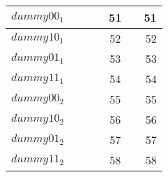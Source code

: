 \begin{tabular}{|l@{\tstrut}|r|r|r|c|r|r|}
$dummy00_1$       &    &  &  &    51 &  & 51   \\ \hline
$dummy10_1$       &    &  &  &    52 &  & 52   \\ \hline
$dummy01_1$       &    &  &  &    53 &  & 53   \\ \hline
$dummy11_1$       &    &  &  &    54 &  & 54   \\ \hline
$dummy00_2$       &    &  &  &    55 &  & 55   \\ \hline
$dummy10_2$       &    &  &  &    56 &  & 56   \\ \hline
$dummy01_2$       &    &  &  &    57 &  & 57   \\ \hline
$dummy11_2$       &    &  &  &    58 &  & 58   \\ \hline
\end{tabular}

\vfill\eject

